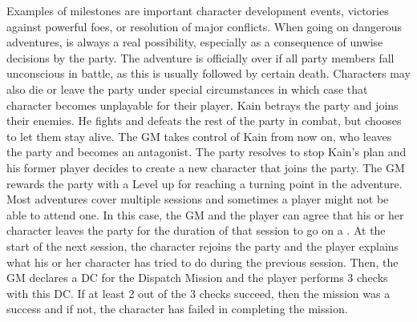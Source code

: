 Examples of milestones are important character development events, victories against powerful foes, or resolution of major conflicts. 
When going on dangerous adventures,  is always a real possibility, especially as a consequence of unwise decisions by the party. 
The adventure is officially over if all party members fall unconscious in battle, as this is usually followed by certain death. 
Characters may also die or leave the party under special circumstances in which case that character becomes unplayable for their player. 
%
\ofpar
%
{
	Kain betrays the party and joins their enemies. 
	He fights and defeats the rest of the party in combat, but chooses to let them stay alive.
	The GM takes control of Kain from now on, who leaves the party and becomes an antagonist.
	The party resolves to stop Kain's plan and his former player decides to create a new character that joins the party. 
	The GM rewards the party with a Level up for reaching a turning point in the adventure.
}
%
\vfill
%
Most adventures cover multiple sessions and sometimes a player might not be able to attend one.
In this case, the GM and the player can agree that his or her character leaves the party for the duration of that session to go on a .
At the start of the next session, the character rejoins the party and the player explains what his or her character has tried to do during the previous session.
Then, the GM declares a DC for the Dispatch Mission and the player performs 3 checks with this DC.
If at least 2 out of the 3 checks succeed, then the mission was a success and if not, the character has failed in completing the mission.
%
\clearpage